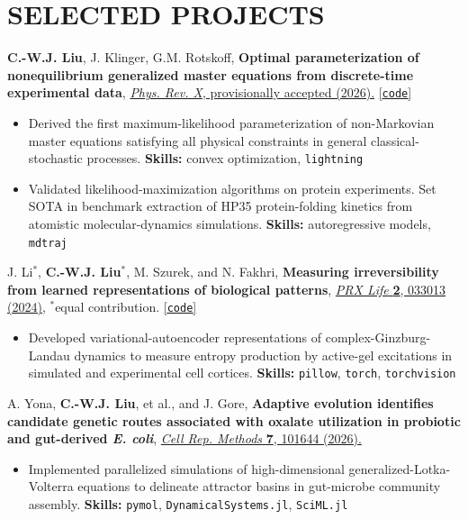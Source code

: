 \documentclass[11pt,letterpaper]{article}
\newcommand{\publication}[1]{#1\par}
\newcommand{\projectsep}{\par\vspace{2pt}}
\begin{document}
\section{SELECTED PROJECTS}
\publication{\textbf{C.-W.J. Liu}, J. Klinger, G.M. Rotskoff, \textbf{Optimal parameterization of nonequilibrium generalized master equations from discrete-time experimental data}, \href{https://doi.org/10.48550/arXiv.2606.28289}{\textit{Phys. Rev. X}, provisionally accepted (2026).} \href{https://github.com/rotskoff-group/GMEx}{[\texttt{code}]}}
\begin{itemize}
\item Derived the first maximum-likelihood parameterization of non-Markovian master equations satisfying all physical constraints in general classical-stochastic processes. \textbf{Skills:} convex optimization, \texttt{lightning}
\item Validated likelihood-maximization algorithms on protein experiments. Set SOTA in benchmark extraction of HP35 protein-folding kinetics from atomistic molecular-dynamics simulations. \textbf{Skills:} autoregressive models, \texttt{mdtraj}
\end{itemize}
\projectsep
\publication{J. Li$^*$, \textbf{C.-W.J. Liu}$^*$, M. Szurek, and N. Fakhri, \textbf{Measuring irreversibility from learned representations of biological patterns}, \href{https://doi.org/10.1103/PRXLife.2.033013}{\textit{PRX Life} \textbf{2}, 033013 (2024),} $^*$equal contribution. \href{https://github.com/cjoshliu/irreversibility-from-representations}{[\texttt{code}]}}
\begin{itemize}
\item Developed variational-autoencoder representations of complex-Ginzburg-Landau dynamics to measure entropy production by active-gel excitations in simulated and experimental cell cortices.
\textbf{Skills:} \texttt{pillow}, \texttt{torch}, \texttt{torchvision}
\end{itemize}
\projectsep
\publication{A. Yona, \textbf{C.-W.J. Liu}, et al., and J. Gore, \textbf{Adaptive evolution identifies candidate genetic routes associated with oxalate utilization in probiotic and gut-derived \textit{E. coli}}, \href{https://doi.org/10.1016/j.crmeth.2026.101644}{\textit{Cell Rep. Methods} \textbf{7}, 101644 (2026).}}
\begin{itemize}
\item Implemented parallelized simulations of high-dimensional generalized-Lotka-Volterra equations to delineate attractor basins in gut-microbe community assembly.
\textbf{Skills:} \texttt{pymol}, \texttt{DynamicalSystems.jl}, \texttt{SciML.jl}
\end{itemize}
\end{document}
